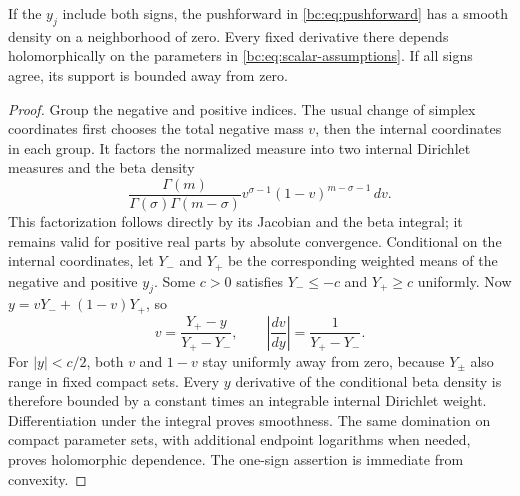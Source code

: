 \begin{lemma}\label{bc:lem:smooth}
If the $y_j$ include both signs, the pushforward in
\eqref{bc:eq:pushforward} has a smooth density on a neighborhood of zero.
Every fixed derivative there depends holomorphically on the parameters
in \eqref{bc:eq:scalar-assumptions}. If all signs agree, its support is
bounded away from zero.
\end{lemma}
\begin{proof}
Group the negative and positive indices. The usual change of simplex
coordinates first chooses the total negative mass $v$, then the internal
coordinates in each group. It factors the normalized measure into two
internal Dirichlet measures and the beta density
\[
 \frac{\Gamma(m)}{\Gamma(\sigma)\Gamma(m-\sigma)}
               v^{\sigma-1}(1-v)^{m-\sigma-1}\,dv.
\]
This factorization follows directly by its Jacobian and the beta
integral; it remains valid for positive real parts by absolute
convergence. Conditional on the internal coordinates, let $Y_-$ and
$Y_+$ be the corresponding weighted means of the negative and positive
$y_j$. Some $c>0$ satisfies $Y_-\le-c$ and $Y_+\ge c$ uniformly.
Now $y=vY_-+(1-v)Y_+$, so
\[
 v=\frac{Y_+-y}{Y_+-Y_-},\qquad
 \left|\frac{dv}{dy}\right|=\frac1{Y_+-Y_-}.
\]
For $|y|<c/2$, both $v$ and $1-v$ stay uniformly away from zero, because
$Y_\pm$ also range in fixed compact sets. Every $y$ derivative of the
conditional beta density is therefore bounded by a constant times an
integrable internal Dirichlet weight. Differentiation under the integral
proves smoothness. The same domination on compact parameter sets, with
additional endpoint logarithms when needed, proves holomorphic
dependence. The one-sign assertion is immediate from convexity.
\end{proof}

